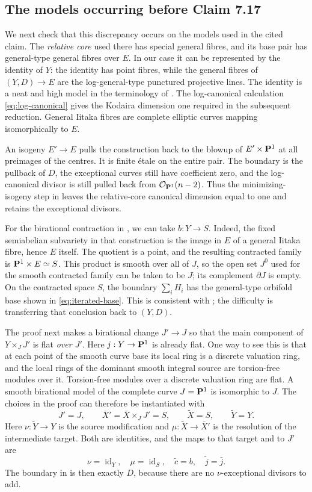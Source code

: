\subsection{The models occurring before Claim 7.17}
We next check that this discrepancy occurs on the models used in the
cited claim. The \emph{relative core} used there has special general
fibres, and its base pair has general-type general fibres over $E$.
In our case it can be represented
by the identity of $Y$: the identity has point fibres, while the general
fibres of $(Y,D)\to E$ are the log-general-type punctured projective
lines. The identity is a neat and high model in the
terminology of \cite[Definitions 2.3 and Theorem 2.10]{CDHP2026}.
The log-canonical calculation \eqref{eq:log-canonical} gives the
Kodaira dimension one required in the subsequent reduction. General
Iitaka fibres are complete elliptic curves mapping isomorphically to
$E$.

An isogeny $E'\to E$ pulls the construction back to the blowup of
$E'\times\mathbf P^1$ at all preimages of the centres. It is finite \'etale on
the entire pair. The boundary is the pullback of $D$, the exceptional
curves still have coefficient zero, and the log-canonical divisor is
still pulled back from $\mathcal O_{\mathbf P^1}(n-2)$. Thus the minimizing-isogeny
step in \cite[Equation (7.15.2)]{CDHP2026} leaves the relative-core
canonical dimension equal to one and retains the exceptional divisors.

For the birational contraction in \cite[Proposition 7.6]{CDHP2026},
we can take $b:Y\to S$. Indeed, the fixed semiabelian subvariety in
that construction is the image in $E$ of a general Iitaka fibre, hence
$E$ itself. The quotient is a point, and the resulting contracted
family is $\mathbf P^1\times E\simeq S$. This product is smooth over all of $J$,
so the open set $J^0$ used for the smooth contracted family can be
taken to be $J$; its complement $\partial J$ is empty.
On the contracted
space $S$, the boundary $\sum_iH_i$ has the general-type orbifold base
shown in \eqref{eq:iterated-base}. This is consistent with
\cite[Claim 7.7]{CDHP2026}; the difficulty is transferring that
conclusion back to $(Y,D)$.

The proof next makes a birational change $J'\to J$ so that the main
component of $Y\times_JJ'$ is flat \emph{over $J'$}. Here
$j:Y\to\mathbf P^1$ is already flat. One way to see this is that at each
point of the smooth curve base its local ring is a discrete valuation
ring, and the local rings of the dominant smooth integral source are
torsion-free modules over it. Torsion-free modules over a discrete
valuation ring are flat. A smooth birational model of the complete
curve $J=\mathbf P^1$ is isomorphic to $J$. The choices in the proof can
therefore be instantiated with
\[
 J'=J,\qquad\bar X'=\bar X\times_JJ'=S,\qquad
 \widetilde X=S,\qquad\widetilde Y=Y.
\]
Here $\nu:\widetilde Y\to Y$ is the source modification and
$\mu:\widetilde X\to\bar X'$ is the resolution of the intermediate
target. Both are identities, and the maps to that target and to $J'$
are
\[
 \nu=\operatorname{id}_Y,\quad\mu=\operatorname{id}_S,\quad
 \widetilde c=b,\quad\widetilde j=\bar j.
\]
The boundary in \cite[Equation (7.16.7)]{CDHP2026} is then exactly $D$,
because there are no $\nu$-exceptional divisors to add.

